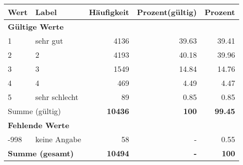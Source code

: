      \begin{longtable}{lXrrr}
     \toprule
     \textbf{Wert} & \textbf{Label} & \textbf{Häufigkeit} & \textbf{Prozent(gültig)} & \textbf{Prozent} \\
     \endhead
     \midrule
     \multicolumn{5}{l}{\textbf{Gültige Werte}}\\

     1 &
     \multicolumn{1}{X}{ sehr gut   } &


       \num{4136} &
       \num[round-mode=places,round-precision=2]{39.63} &
         \num[round-mode=places,round-precision=2]{39.41} \\

     2 &
     \multicolumn{1}{X}{ 2   } &


       \num{4193} &
       \num[round-mode=places,round-precision=2]{40.18} &
         \num[round-mode=places,round-precision=2]{39.96} \\

     3 &
     \multicolumn{1}{X}{ 3   } &


       \num{1549} &
       \num[round-mode=places,round-precision=2]{14.84} &
         \num[round-mode=places,round-precision=2]{14.76} \\

     4 &
     \multicolumn{1}{X}{ 4   } &


       \num{469} &
       \num[round-mode=places,round-precision=2]{4.49} &
         \num[round-mode=places,round-precision=2]{4.47} \\

     5 &
     \multicolumn{1}{X}{ sehr schlecht   } &


       \num{89} &
       \num[round-mode=places,round-precision=2]{0.85} &
         \num[round-mode=places,round-precision=2]{0.85} \\
     \midrule
     \multicolumn{2}{l}{Summe (gültig)} &
       \textbf{\num{10436}} &
     \textbf{\num{100}} &
       \textbf{\num[round-mode=places,round-precision=2]{99.45}} \\
     \multicolumn{5}{l}{\textbf{Fehlende Werte}}\\
       -998 &
       keine Angabe &
         \num{58} &
        - &
         \num[round-mode=places,round-precision=2]{0.55} \\
     \midrule
     \multicolumn{2}{l}{\textbf{Summe (gesamt)}} &
          \textbf{\num{10494}} &
        \textbf{-} &
        \textbf{\num{100}} \\
     \bottomrule
     \end{longtable}
     
